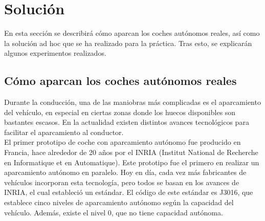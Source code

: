 \section{Solución}
En esta sección se describirá cómo aparcan los coches autónomos reales, así como la solución ad hoc que se ha realizado para la práctica. Tras esto, se explicarán algunos experimentos realizados. \\

\subsection{Cómo aparcan los coches autónomos reales}
Durante la conducción, una de las maniobras más complicadas es el aparcamiento del vehículo, en especial en ciertas zonas donde los huecos disponibles son bastantes escasos. En la actualidad existen distintos avances tecnológicos para facilitar el aparcamiento al conductor. \\

El primer prototipo de coche con aparcamiento autónomo fue producido en Francia, hace alrededor de 20 años por el INRIA (Institut National de Recherche en Informatique et en Automatique). Este prototipo fue el primero en realizar un aparcamiento autónomo en paralelo. Hoy en día, cada vez más fabricantes de vehículos incorporan esta tecnología, pero todos se basan en los avances de INRIA, el cual estableció un estándar. El código de este estándar es J3016, que establece cinco niveles de aparcamiento autónomo según la capacidad del vehículo. Además, existe el nivel 0, que no tiene capacidad autónoma.

